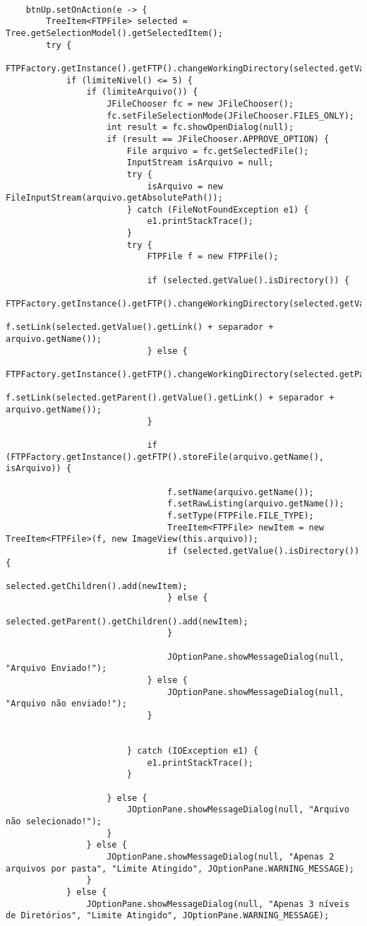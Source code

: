 \documentclass[12pt]{article}
\begin{document}
\begin{lstlisting}
	
	btnUp.setOnAction(e -> {
		TreeItem<FTPFile> selected = Tree.getSelectionModel().getSelectedItem();
		try {
			FTPFactory.getInstance().getFTP().changeWorkingDirectory(selected.getValue().getLink());
			if (limiteNivel() <= 5) {
				if (limiteArquivo()) {
					JFileChooser fc = new JFileChooser();
					fc.setFileSelectionMode(JFileChooser.FILES_ONLY);
					int result = fc.showOpenDialog(null);
					if (result == JFileChooser.APPROVE_OPTION) {
						File arquivo = fc.getSelectedFile();
						InputStream isArquivo = null;
						try {
							isArquivo = new FileInputStream(arquivo.getAbsolutePath());
						} catch (FileNotFoundException e1) {
							e1.printStackTrace();
						}
						try {
							FTPFile f = new FTPFile();
							
							if (selected.getValue().isDirectory()) {
								FTPFactory.getInstance().getFTP().changeWorkingDirectory(selected.getValue().getLink());
								f.setLink(selected.getValue().getLink() + separador + arquivo.getName());
							} else {
								FTPFactory.getInstance().getFTP().changeWorkingDirectory(selected.getParent().getValue().getLink());
								f.setLink(selected.getParent().getValue().getLink() + separador + arquivo.getName());
							}
							
							if (FTPFactory.getInstance().getFTP().storeFile(arquivo.getName(), isArquivo)) {
								
								f.setName(arquivo.getName());
								f.setRawListing(arquivo.getName());
								f.setType(FTPFile.FILE_TYPE);
								TreeItem<FTPFile> newItem = new TreeItem<FTPFile>(f, new ImageView(this.arquivo));
								if (selected.getValue().isDirectory()) {
									selected.getChildren().add(newItem);
								} else {
									selected.getParent().getChildren().add(newItem);
								}
								
								JOptionPane.showMessageDialog(null, "Arquivo Enviado!");
							} else {
								JOptionPane.showMessageDialog(null, "Arquivo não enviado!");
							}
							
							
						} catch (IOException e1) {
							e1.printStackTrace();
						}
						
					} else {
						JOptionPane.showMessageDialog(null, "Arquivo não selecionado!");
					}
				} else {
					JOptionPane.showMessageDialog(null, "Apenas 2 arquivos por pasta", "Limite Atingido", JOptionPane.WARNING_MESSAGE);
				}
			} else {
				JOptionPane.showMessageDialog(null, "Apenas 3 níveis de Diretórios", "Limite Atingido", JOptionPane.WARNING_MESSAGE);
				

\end{lstlisting}
\end{document}
